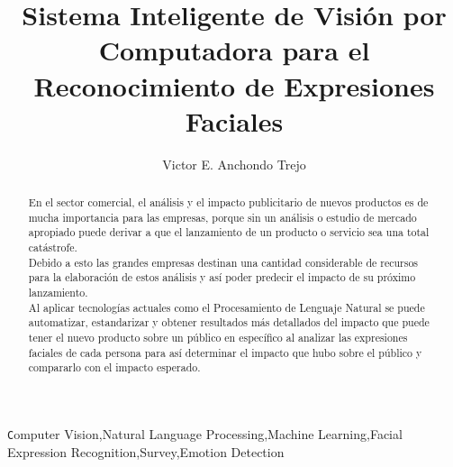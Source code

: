 
\begin{frontmatter}

    \title{Sistema Inteligente de Visión por Computadora para el Reconocimiento de Expresiones Faciales}

    \author{Victor E. Anchondo Trejo}
    \address{Montana 2038, Chihuahua, Chihuahua, México}

    \begin{abstract}
        En el sector comercial, el análisis y el impacto publicitario de nuevos productos es de mucha importancia para las empresas, porque sin un análisis o estudio de mercado apropiado puede derivar a que el lanzamiento de un producto o servicio sea una total catástrofe.
        \\Debido a esto las grandes empresas destinan una cantidad considerable de recursos para la elaboración de estos análisis y así poder predecir el impacto de su próximo lanzamiento.
        \\Al aplicar tecnologías actuales como el Procesamiento de Lenguaje Natural se puede automatizar, estandarizar y obtener resultados más detallados del impacto que puede tener el nuevo producto sobre un público en específico al analizar las expresiones faciales de cada persona para así determinar el impacto que hubo sobre el público y compararlo con el impacto esperado.
    \end{abstract}

    \begin{keyword}
        \texttt Computer Vision\sep Natural Language Processing\sep Machine Learning\sep Facial Expression Recognition\sep Survey\sep Emotion Detection
    \end{keyword}

\end{frontmatter}